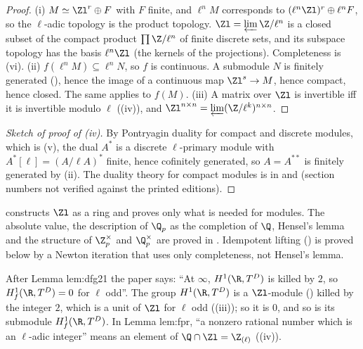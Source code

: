 \begin{proof}
(i) $M\simeq\Zl^r\oplus F$ with $F$ finite, and $\ell^nM$ corresponds to $(\ell^n\Zl)^r\oplus\ell^nF$, so the $\ell$-adic topology is the product topology.
$\Zl=\varprojlim\Z/\ell^n$ is a closed subset of the compact product $\prod\Z/\ell^n$ of finite discrete sets, and its subspace topology has the
basis $\ell^n\Zl$ (the kernels of the projections). Completeness is (vi).
(ii) $f(\ell^nM)\subseteq\ell^nN$, so $f$ is continuous. A submodule $N$ is finitely generated (), hence the image of a
continuous map $\Zl^s\to M$, hence compact, hence closed. The same applies to $f(M)$.
(iii) A matrix over $\Zl$ is invertible iff it is invertible modulo $\ell$ ((iv)), and $\Zl^{n\times n}=\varprojlim(\Z/\ell^k)^{n\times n}$.
\end{proof}

\begin{proof}[Sketch of proof of (iv)]
By Pontryagin duality for compact and discrete modules, which is (v), the dual $A^*$ is a discrete $\ell$-primary module with
$A^*[\ell]=(A/\ell A)^*$ finite, hence cofinitely generated, so $A=A^{**}$ is finitely generated by (ii). The
duality theory for compact modules is in \cite[Chapter I, Section 1, and Chapter V, Section 2]{NSW} and \cite[Appendix B]{Rubin}
(section numbers not verified against the printed editions).
\end{proof}

\begin{warning}\label{warn:modules:analytic}
 constructs $\Zl$ as a ring and proves only what is needed for modules. The absolute value, the description of $\Q_p$ as
the completion of $\Q$, Hensel's lemma and the structure of $\Z_p^\times$ and $\Q_p^\times$ are proved in . Idempotent lifting
() is proved below by a Newton iteration that uses only completeness, not Hensel's lemma.
\end{warning}

\begin{paperlink}\label{pl:modules:killed-by-2}
After Lemma lem:dfg21 the paper says: ``At $\infty$, $H^1(\R,T^D)$ is killed by $2$, so $H^1_f(\R,T^D)=0$ for $\ell$ odd''. The group
$H^1(\R,T^D)$ is a $\Zl$-module () killed by the integer $2$, which is a unit of $\Zl$ for $\ell$ odd
((iii)); so it is $0$, and so is its submodule $H^1_f(\R,T^D)$. In Lemma lem:fpr, ``a nonzero rational number which is an
$\ell$-adic integer'' means an element of $\Q\cap\Zl=\Z_{(\ell)}$ ((iv)).
\end{paperlink}

